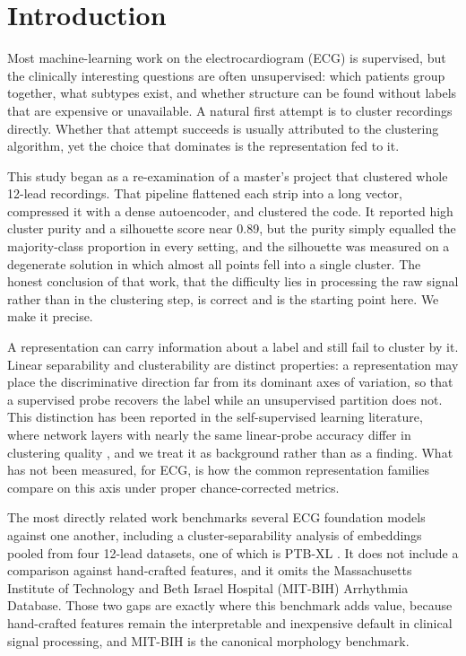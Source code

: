 \documentclass[preprint,11pt]{elsarticle}
\begin{document}
\section{Introduction}\label{sec:intro}

Most machine-learning work on the electrocardiogram (ECG) is supervised, but the
clinically interesting questions are often unsupervised: which patients group
together, what subtypes exist, and whether structure can be found without labels
that are expensive or unavailable. A natural first attempt is to cluster recordings
directly. Whether that attempt succeeds is usually attributed to the clustering
algorithm, yet the choice that dominates is the representation fed to it.

This study began as a re-examination of a master's project that clustered whole
12-lead recordings. That pipeline flattened each strip into a long vector, compressed
it with a dense autoencoder, and clustered the code. It reported high cluster purity
and a silhouette score near 0.89, but the purity simply equalled the majority-class
proportion in every setting, and the silhouette was measured on a degenerate solution
in which almost all points fell into a single cluster. The honest conclusion of that
work, that the difficulty lies in processing the raw signal rather than in the
clustering step, is correct and is the starting point here. We make it precise.

A representation can carry information about a label and still fail to cluster by it.
Linear separability and clusterability are distinct properties: a representation may
place the discriminative direction far from its dominant axes of variation, so that a
supervised probe recovers the label while an unsupervised partition does not. This
distinction has been reported in the self-supervised learning literature, where network
layers with nearly the same linear-probe accuracy differ in clustering quality
\cite{sslclustering2025}, and we treat it as background rather than as a finding. What
has not been measured, for ECG, is how the common representation families compare on
this axis under proper chance-corrected metrics.

The most directly related work benchmarks several ECG foundation models against one
another, including a cluster-separability analysis of embeddings pooled from four
12-lead datasets, one of which is PTB-XL \cite{lookingbeyond2026}.
It does not include a comparison against
hand-crafted features, and it omits the Massachusetts Institute of Technology and Beth
Israel Hospital (MIT-BIH) Arrhythmia Database. Those two gaps are exactly
where this benchmark adds value, because hand-crafted features remain the
interpretable and inexpensive default in clinical signal processing, and MIT-BIH is the
canonical morphology benchmark.
\end{document}
